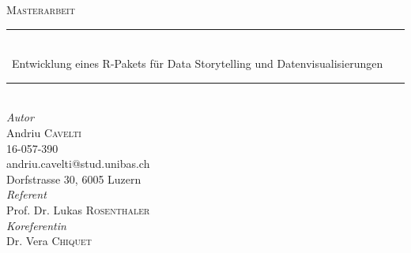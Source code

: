 


	\newcommand{\HRule}{\rule{\linewidth}{0.5mm}} %

	\begin{center}



	\textsc{\Large Masterarbeit}\\[1.25cm] %


	\HRule\\[0.4cm]

	{\huge\ Entwicklung eines R-Pakets für Data Storytelling und Datenvisualisierungen}\\[0.4cm] %

	\HRule\\[1.5cm]


	\large
	  \textit{Autor}\\
	  Andriu \textsc{Cavelti}\\
	  16-057-390\\
	  andriu.cavelti@stud.unibas.ch\\
	  Dorfstrasse 30, 6005 Luzern\\[1.5cm]

	  \textit{Referent}\\
	  Prof. Dr. Lukas \textsc{Rosenthaler}\\[0.5cm]
	  \textit{Koreferentin}\\
		Dr. Vera \textsc{Chiquet}\\[1.5cm]


\end{center}
